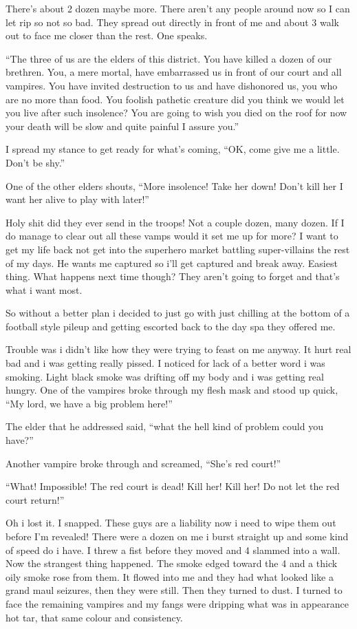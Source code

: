 There's about 2 dozen maybe more. There aren't any people around now so I can let rip so not so bad. They spread out directly in front of me and about 3 walk out to face me closer than the rest. One speaks.

``The three of us are the elders of this district. You have killed a dozen of our brethren. You, a mere mortal, have embarrassed us in front of our court and all vampires. You have invited destruction to us and have dishonored us, you who are no more than food. You foolish pathetic creature did you think we would let you live after such insolence? You are going to wish you died on the roof for now your death will be slow and quite painful I assure you.''

I spread my stance to get ready for what's coming, ``OK, come give me a little. Don't be shy.''

One of the other elders shouts, ``More insolence! Take her down! Don't kill her I want her alive to play with later!''

Holy shit did they ever send in the troops! Not a couple dozen, many dozen. If I do manage to clear out all these vamps would it set me up for more? I want to get my life back not get into the superhero market battling super-villains the rest of my days. He wants me captured so i'll get captured and break away. Easiest thing. What happens next time though? They aren't going to forget and that's what i want most.

So without a better plan i decided to just go with just chilling at the bottom of a football style pileup and getting escorted back to the day spa they offered me.

Trouble was i didn't like how they were trying to feast on me anyway. It hurt real bad and i was getting really pissed. I noticed for lack of a better word i was smoking. Light black smoke was drifting off my body and i was getting real hungry. One of the vampires broke through my flesh mask and stood up quick, ``My lord, we have a big problem here!'' 

The elder that he addressed said, ``what the hell kind of problem could you have?'' 

Another vampire broke through and screamed, ``She's red court!''

``What! Impossible! The red court is dead! Kill her! Kill her! Do not let the red court return!''

Oh i lost it. I snapped. These guys are a liability now i need to wipe them out before I'm revealed! There were a dozen on me i burst straight up and some kind of speed do i have. I threw a fist before they moved and 4 slammed into a wall. Now the strangest thing happened. The smoke edged toward the 4 and a thick oily smoke rose from them. It flowed into me and they had what looked like a grand maul seizures, then they were still. Then they turned to dust. I turned to face the remaining vampires and my fangs were dripping what was in appearance hot tar, that same colour and consistency.

